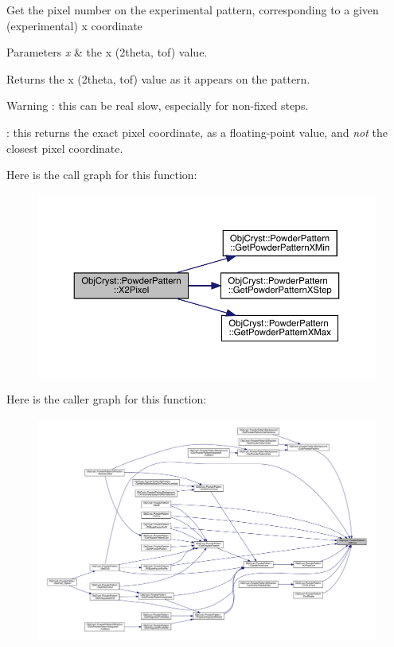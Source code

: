 Get the pixel number on the experimental pattern, corresponding to a given (experimental) x coordinate 
\begin{DoxyParams}{Parameters}
{\em x} & the x (2theta, tof) value. \\
\hline
\end{DoxyParams}
\begin{DoxyReturn}{Returns}
the x (2theta, tof) value as it appears on the pattern.
\end{DoxyReturn}
\begin{DoxyWarning}{Warning}
\+: this can be real slow, especially for non-\/fixed steps.

\+: this returns the exact pixel coordinate, as a floating-\/point value, and {\itshape not} the closest pixel coordinate. 
\end{DoxyWarning}
Here is the call graph for this function\+:
\nopagebreak
\begin{figure}[H]
\begin{center}
\leavevmode
\includegraphics[width=350pt]{class_obj_cryst_1_1_powder_pattern_a0146d35bdc502a6f40f006de837fb490_cgraph}
\end{center}
\end{figure}
Here is the caller graph for this function\+:
\nopagebreak
\begin{figure}[H]
\begin{center}
\leavevmode
\includegraphics[width=350pt]{class_obj_cryst_1_1_powder_pattern_a0146d35bdc502a6f40f006de837fb490_icgraph}
\end{center}
\end{figure}
\mbox{\label{class_obj_cryst_1_1_powder_pattern_a863415fc0586da70ea29600ffe01d954}} 
